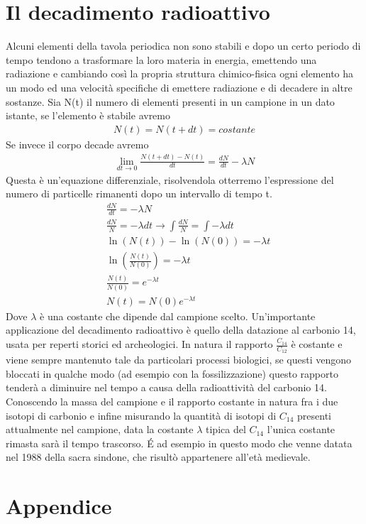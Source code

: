 \section{Il decadimento radioattivo}
Alcuni elementi della tavola periodica non sono stabili e dopo un certo periodo di tempo tendono a trasformare la loro materia in energia, emettendo una radiazione e cambiando così la propria struttura chimico-fisica ogni elemento ha un modo ed una velocità specifiche di emettere radiazione e di decadere in altre sostanze. Sia N(t) il numero di elementi presenti in un campione in un dato istante, se l'elemento è stabile avremo
\begin{align*}
	N(t) =  N(t+dt) = costante
\end{align*} 
Se invece il corpo decade avremo
\begin{align*}
	\lim_{dt \to 0}\frac{N(t+dt)-N(t)}{dt} =\frac{dN}{dt} -\lambda N
\end{align*}
Questa è un'equazione differenziale, risolvendola otterremo l'espressione del numero di particelle rimanenti dopo un intervallo di tempo t.
\begin{align*}
&\frac{dN}{dt} = -\lambda N\\
&\frac{dN}{N} = -\lambda dt \rightarrow \int \frac{dN}{N} = \int -\lambda dt\\
&\ln(N(t))-\ln(N(0))=-\lambda t\\
&\ln(\frac{N(t)}{N(0)})=-\lambda t\\
&\frac{N(t)}{N(0)} = e^{-\lambda t}\\
&N(t)=N(0)e^{-\lambda t}
\end{align*}
Dove $\lambda$ è una costante che dipende dal campione scelto. Un'importante applicazione del decadimento radioattivo è quello della datazione al carbonio 14, usata per reperti storici ed archeologici. In natura il rapporto $\frac{C_14}{C_12}$ è costante e viene sempre mantenuto tale da particolari processi biologici, se questi vengono bloccati in qualche modo (ad esempio con la fossilizzazione) questo rapporto tenderà a diminuire nel tempo a causa della radioattività del carbonio 14. Conoscendo la massa del campione e il rapporto costante in natura fra i due isotopi di carbonio e infine misurando la quantità di isotopi di $C_14$ presenti attualmente nel campione, data la costante $\lambda$ tipica del $C_14$ l'unica costante rimasta sarà il tempo trascorso. \'{E} ad esempio in questo modo che venne datata nel 1988 della sacra sindone, che risultò appartenere all'età medievale. 
\newpage
\section{Appendice}
